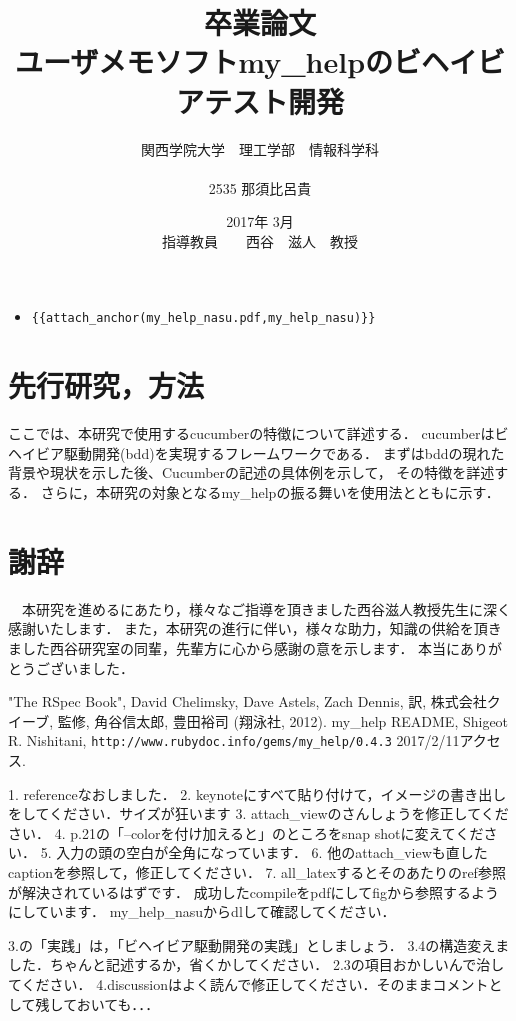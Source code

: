 \documentclass[12pt,a4paper]{jsarticle}
\begin{document}
\title{卒業論文\\
\vspace{4cm} ユーザメモソフトmy\_helpのビヘイビアテスト開発}
\author{ 関西学院大学　理工学部　情報科学科\\\\2535 那須比呂貴}
\date{\vspace{3cm} 2017年  3月\\
\vspace{3cm} 指導教員　　西谷　滋人　教授}
\maketitle
\setcounter{tocdepth}{4}
\tableofcontents

\begin{itemize}
\item \verb|{{attach_anchor(my_help_nasu.pdf,my_help_nasu)}}|
\end{itemize}


\section{先行研究，方法}
ここでは、本研究で使用するcucumberの特徴について詳述する．
cucumberはビヘイビア駆動開発(bdd)を実現するフレームワークである．
まずはbddの現れた背景や現状を示した後、Cucumberの記述の具体例を示して，
その特徴を詳述する．
さらに，本研究の対象となるmy\_helpの振る舞いを使用法とともに示す．







\section{謝辞}
　本研究を進めるにあたり，様々なご指導を頂きました西谷滋人教授先生に深く感謝いたします．
また，本研究の進行に伴い，様々な助力，知識の供給を頂きました西谷研究室の同輩，先輩方に心から感謝の意を示します．
本当にありがとうございました．

\begin{thebibliography}{99}
   "The RSpec Book", David Chelimsky, Dave Astels, Zach Dennis, 訳, 株式会社クイーブ, 監修, 角谷信太郎, 豊田裕司 (翔泳社, 2012).
   my\_help README, Shigeot R. Nishitani, \verb|http://www.rubydoc.info/gems/my_help/0.4.3| 2017/2/11アクセス.
\end{thebibliography}
1. referenceなおしました．
2. keynoteにすべて貼り付けて，イメージの書き出しをしてください．サイズが狂います
3. attach\_viewのさんしょうを修正してください．
4. p.21の「--colorを付け加えると」のところをsnap shotに変えてください．
5. 入力の頭の空白が全角になっています．
6. 他のattach\_viewも直したcaptionを参照して，修正してください．
7. all\_latexするとそのあたりのref参照が解決されているはずです．
成功したcompileをpdfにしてfigから参照するようにしています．
my\_help\_nasuからdlして確認してください．

3.の「実践」は，「ビヘイビア駆動開発の実践」としましょう．
3.4の構造変えました．ちゃんと記述するか，省くかしてください．
2.3の項目おかしいんで治してください．
4.discussionはよく読んで修正してください．そのままコメントとして残しておいても．．．
\end{document}

